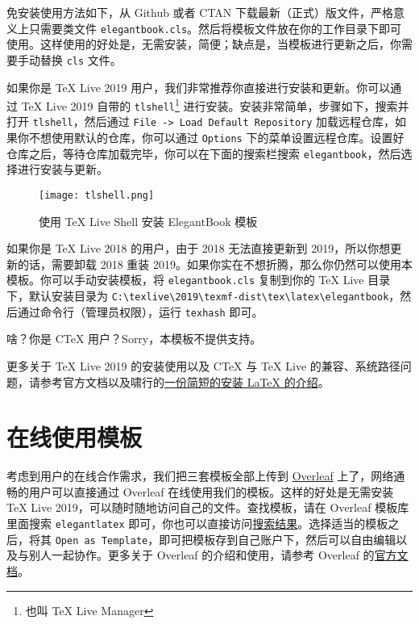 \documentclass[cn,11pt]{elegantbook}
\begin{document}
免安装使用方法如下，从 Github 或者 CTAN 下载最新（正式）版文件，严格意义上只需要类文件 \lstinline{elegantbook.cls}。然后将模板文件放在你的工作目录下即可使用。这样使用的好处是，无需安装，简便；缺点是，当模板进行更新之后，你需要手动替换 \lstinline{cls} 文件。

如果你是 \TeX{} Live 2019 用户，我们非常推荐你直接进行安装和更新。你可以通过 \TeX{} Live 2019 自带的 \lstinline{tlshell}\footnote{也叫 \TeX{} Live Manager} 进行安装。安装非常简单，步骤如下，搜索并打开 \lstinline{tlshell}，然后通过 \lstinline{File -> Load Default Repository} 加载远程仓库，如果你不想使用默认的仓库，你可以通过 \lstinline{Options} 下的菜单设置远程仓库。设置好仓库之后，等待仓库加载完毕，你可以在下面的搜索栏搜索 \lstinline{elegantbook}，然后选择进行安装与更新。

\begin{figure}[htbp]
\centering
\texttt{[image: tlshell.png]}
\caption{使用 \TeX{} Live Shell 安装 ElegantBook 模板}
\end{figure}

如果你是 \TeX{} Live 2018 的用户，由于 2018 无法直接更新到 2019，所以你想更新的话，需要卸载 2018 重装 2019。如果你实在不想折腾，那么你仍然可以使用本模板。你可以手动安装模板，将 \lstinline{elegantbook.cls} 复制到你的 \TeX{} Live 目录下，默认安装目录为 \lstinline|C:\texlive\2019\texmf-dist\tex\latex\elegantbook|，然后通过命令行（管理员权限），运行 \lstinline{texhash} 即可。

啥？你是 C\TeX{} 用户？Sorry，本模板不提供支持。

更多关于 \TeX{} Live 2019 的安装使用以及 C\TeX{} 与 \TeX{} Live 的兼容、系统路径问题，请参考官方文档以及啸行的\href{https://github.com/OsbertWang/install_latex/releases}{一份简短的安装 \LaTeX{} 的介绍}。

\section{在线使用模板}
考虑到用户的在线合作需求，我们把三套模板全部上传到 \href{https://www.overleaf.com/}{Overleaf} 上了，网络通畅的用户可以直接通过 Overleaf 在线使用我们的模板。这样的好处是无需安装 \TeX{} Live 2019，可以随时随地访问自己的文件。查找模板，请在 Overleaf 模板库里面搜索 \lstinline{elegantlatex} 即可，你也可以直接访问\href{https://www.overleaf.com/latex/templates?addsearch=elegantlatex}{搜索结果}。选择适当的模板之后，将其 \lstinline{Open as Template}，即可把模板存到自己账户下，然后可以自由编辑以及与别人一起协作。更多关于 Overleaf 的介绍和使用，请参考 Overleaf 的\href{https://www.overleaf.com/learn}{官方文档}。
\end{document}
